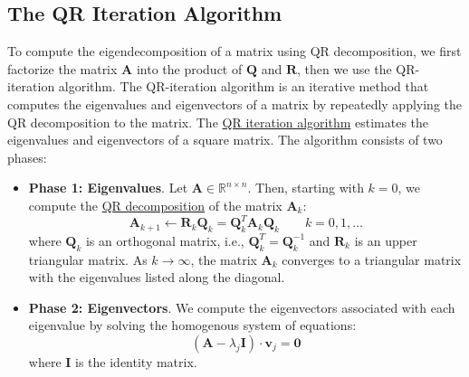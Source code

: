 \documentclass{article}[12pt]
\begin{document}
\subsection{The QR Iteration Algorithm}
To compute the eigendecomposition of a matrix using QR decomposition, we first factorize the matrix $\mathbf{A}$ into the product of $\mathbf{Q}$ and $\mathbf{R}$, 
then we use the QR-iteration algorithm. The QR-iteration algorithm is an iterative method that computes the eigenvalues and eigenvectors of a matrix by repeatedly applying the QR decomposition to the matrix.
The \href{https://en.wikipedia.org/wiki/QR_algorithm}{QR iteration algorithm} estimates the eigenvalues and eigenvectors of a square matrix.
The algorithm consists of two phases:
\begin{itemize}
\item{\textbf{Phase 1: Eigenvalues}. Let $\mathbf{A}\in\mathbb{R}^{n\times{n}}$. 
Then, starting with $k = 0$, we compute the \href{https://en.wikipedia.org/wiki/QR_decomposition}{QR decomposition} of the matrix $\mathbf{A}_{k}$:
\begin{equation*}
\mathbf{A}_{k+1}\leftarrow\mathbf{R}_{k}\mathbf{Q}_{k} = \mathbf{Q}_{k}^{T}\mathbf{A}_{k}\mathbf{Q}_{k}\qquad{k=0,1,\dots} 
\end{equation*}
where $\mathbf{Q}_{k}$ is an orthogonal matrix, i.e., $\mathbf{Q}^{T}_{k} = \mathbf{Q}^{-1}_{k}$ and $\mathbf{R}_{k}$ is an upper triangular matrix. 
As $k\rightarrow\infty$, the matrix $\mathbf{A}_{k}$ converges to a triangular matrix with the eigenvalues listed along the diagonal.}
\item{\textbf{Phase 2: Eigenvectors}. We compute the eigenvectors associated with each eigenvalue by solving the homogenous system of equations:
\begin{equation*}
\left(\mathbf{A}-\lambda_{j}\mathbf{I}\right)\cdot\mathbf{v}_{j} = \mathbf{0}
\end{equation*}
where $\mathbf{I}$ is the identity matrix.}
\end{itemize}
\end{document}
